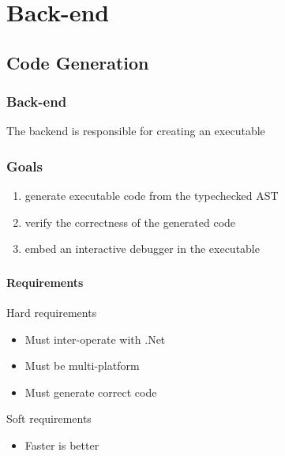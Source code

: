 \section{Back-end}

\subsection{Code Generation}

\begin{frame}
    \frametitle{Back-end}
    The backend is responsible for creating an executable
\end{frame}

\begin{frame}
    \frametitle{Goals}
    \begin{enumerate}
    \item generate executable code from the typechecked AST
    \item verify the correctness of the generated code 
    \item embed an interactive debugger in the executable
    \end{enumerate}
\end{frame}

\begin{frame}
    \frametitle{\subsecname}
    \framesubtitle{Requirements}
    Hard requirements
    \begin{itemize}
    \item Must inter-operate with .Net
    \item Must be multi-platform
    \item Must generate correct code
    \end{itemize}
    Soft requirements
    \begin{itemize}
    \item Faster is better
    \end{itemize}
\end{frame}

